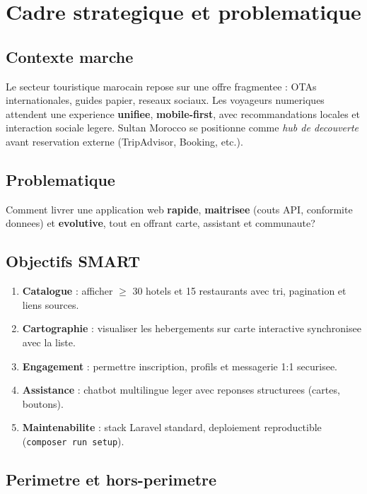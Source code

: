 \chapter{Cadre strategique et problematique}
\label{ch:intro}

\section{Contexte marche}

Le secteur touristique marocain repose sur une offre fragmentee : OTAs internationales, guides papier, reseaux sociaux. Les voyageurs numeriques attendent une experience \textbf{unifiee}, \textbf{mobile-first}, avec recommandations locales et interaction sociale legere. Sultan Morocco se positionne comme \textit{hub de decouverte} avant reservation externe (TripAdvisor, Booking, etc.).

\section{Problematique}

Comment livrer une application web \textbf{rapide}, \textbf{maitrisee} (couts API, conformite donnees) et \textbf{evolutive}, tout en offrant carte, assistant et communaute?

\section{Objectifs SMART}

\begin{enumerate}
  \item \textbf{Catalogue} : afficher $\geq$ 30 hotels et 15 restaurants avec tri, pagination et liens sources.
  \item \textbf{Cartographie} : visualiser les hebergements sur carte interactive synchronisee avec la liste.
  \item \textbf{Engagement} : permettre inscription, profils et messagerie 1:1 securisee.
  \item \textbf{Assistance} : chatbot multilingue leger avec reponses structurees (cartes, boutons).
  \item \textbf{Maintenabilite} : stack Laravel standard, deploiement reproductible (\texttt{composer run setup}).
\end{enumerate}

\section{Perimetre et hors-perimetre}

